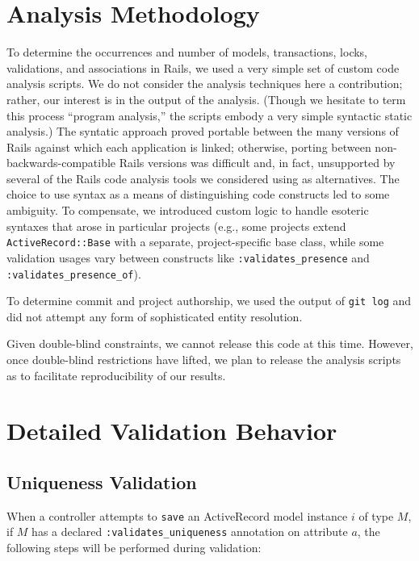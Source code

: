 
\appendix

\section{Analysis Methodology}

To determine the occurrences and number of models, transactions, locks, validations, and associations in Rails, we used a very simple set of custom code analysis scripts. We do not consider the analysis techniques here a contribution; rather, our interest is in the output of the analysis.  (Though we hesitate to term this process ``program analysis,'' the scripts embody a very simple syntactic static analysis.) The syntatic approach proved portable between the many versions of Rails against which each application is linked; otherwise, porting between non-backwards-compatible Rails versions was difficult and, in fact, unsupported by several of the Rails code analysis tools we considered using as alternatives. The choice to use syntax as a means of distinguishing code constructs led to some ambiguity. To compensate, we introduced custom logic to handle esoteric syntaxes that arose in particular projects (e.g., some projects extend \texttt{ActiveRecord::Base} with a separate, project-specific base class, while some validation usages vary between constructs like \texttt{:validates\_presence} and \texttt{:validates\_presence\_of}).

To determine commit and project authorship, we used the output of \texttt{git log} and did not attempt any form of sophisticated entity resolution.

Given double-blind constraints, we cannot release this code at this time. However, once double-blind restrictions have lifted, we plan to release the analysis scripts as to facilitate reproducibility of our results.

\section{Detailed Validation Behavior}

\subsection{Uniqueness Validation}
\label{sec:appendix-uniqueness-behavior}

When a controller attempts to \texttt{save} an ActiveRecord model instance $i$ of type $M$, if $M$ has a declared \texttt{:validates\_uniqueness} annotation on attribute $a$, the following steps will be performed during validation:

